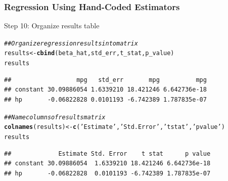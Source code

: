 \documentclass{beamer}\usepackage[]{graphicx}\usepackage[]{xcolor}
\makeatletter
\newcommand{\hlstr}[1]{\textcolor[rgb]{0.192,0.494,0.8}{#1}}%
\newcommand{\hlcom}[1]{\textcolor[rgb]{0.678,0.584,0.686}{\textit{#1}}}%
\newcommand{\hlstd}[1]{\textcolor[rgb]{0.345,0.345,0.345}{#1}}%
\newcommand{\hlkwb}[1]{\textcolor[rgb]{0.69,0.353,0.396}{#1}}%
\newcommand{\hlkwd}[1]{\textcolor[rgb]{0.737,0.353,0.396}{\textbf{#1}}}%
\newenvironment{kframe}{%
 \def\at@end@of@kframe{}%
 \ifinner\ifhmode%
  \def\at@end@of@kframe{\end{minipage}}%
  \begin{minipage}{\columnwidth}%
 \fi\fi%
 \def\FrameCommand##1{\hskip\@totalleftmargin \hskip-\fboxsep
 \colorbox{shadecolor}{##1}\hskip-\fboxsep
     \hskip-\linewidth \hskip-\@totalleftmargin \hskip\columnwidth}%
 \MakeFramed {\advance\hsize-\width
   \@totalleftmargin\z@ \linewidth\hsize
   \@setminipage}}%
 {\par\unskip\endMakeFramed%
 \at@end@of@kframe}
\newenvironment{knitrout}{}{} %
\makeatother
\begin{document}
\begin{frame}[fragile]\frametitle{Regression Using Hand-Coded Estimators}
    Step 10: Organize results table
\begin{knitrout}\footnotesize
{}\color{fgcolor}\begin{kframe}
\begin{alltt}
\hlcom{## Organize regression results into matrix}
\hlstd{results} \hlkwb{<-} \hlkwd{cbind}\hlstd{(beta_hat, std_err, t_stat, p_value)}
\hlstd{results}
\end{alltt}
\begin{verbatim}
##                  mpg   std_err       mpg          mpg
## constant 30.09886054 1.6339210 18.421246 6.642736e-18
## hp       -0.06822828 0.0101193 -6.742389 1.787835e-07
\end{verbatim}
\begin{alltt}
\hlcom{## Name columns of results matrix}
\hlkwd{colnames}\hlstd{(results)} \hlkwb{<-} \hlkwd{c}\hlstd{(}\hlstr{'Estimate'}\hlstd{,} \hlstr{'Std. Error'}\hlstd{,} \hlstr{'t stat'}\hlstd{,} \hlstr{'p value'}\hlstd{)}
\hlstd{results}
\end{alltt}
\begin{verbatim}
##             Estimate Std. Error    t stat      p value
## constant 30.09886054  1.6339210 18.421246 6.642736e-18
## hp       -0.06822828  0.0101193 -6.742389 1.787835e-07
\end{verbatim}
\end{kframe}
\end{knitrout}
\end{frame}
\end{document}
